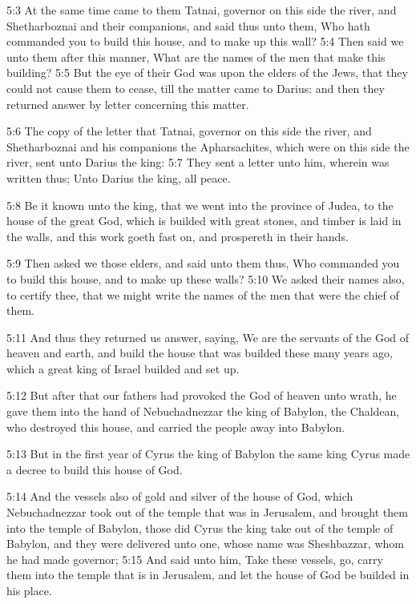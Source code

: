 5:3 At the same time came to them Tatnai, governor on this side the
river, and Shetharboznai and their companions, and said thus unto
them, Who hath commanded you to build this house, and to make up this
wall?  5:4 Then said we unto them after this manner, What are the
names of the men that make this building?  5:5 But the eye of their
God was upon the elders of the Jews, that they could not cause them to
cease, till the matter came to Darius: and then they returned answer
by letter concerning this matter.

5:6 The copy of the letter that Tatnai, governor on this side the
river, and Shetharboznai and his companions the Apharsachites, which
were on this side the river, sent unto Darius the king: 5:7 They sent
a letter unto him, wherein was written thus; Unto Darius the king, all
peace.

5:8 Be it known unto the king, that we went into the province of
Judea, to the house of the great God, which is builded with great
stones, and timber is laid in the walls, and this work goeth fast on,
and prospereth in their hands.

5:9 Then asked we those elders, and said unto them thus, Who commanded
you to build this house, and to make up these walls?  5:10 We asked
their names also, to certify thee, that we might write the names of
the men that were the chief of them.

5:11 And thus they returned us answer, saying, We are the servants of
the God of heaven and earth, and build the house that was builded
these many years ago, which a great king of Israel builded and set up.

5:12 But after that our fathers had provoked the God of heaven unto
wrath, he gave them into the hand of Nebuchadnezzar the king of
Babylon, the Chaldean, who destroyed this house, and carried the
people away into Babylon.

5:13 But in the first year of Cyrus the king of Babylon the same king
Cyrus made a decree to build this house of God.

5:14 And the vessels also of gold and silver of the house of God,
which Nebuchadnezzar took out of the temple that was in Jerusalem, and
brought them into the temple of Babylon, those did Cyrus the king take
out of the temple of Babylon, and they were delivered unto one, whose
name was Sheshbazzar, whom he had made governor; 5:15 And said unto
him, Take these vessels, go, carry them into the temple that is in
Jerusalem, and let the house of God be builded in his place.

